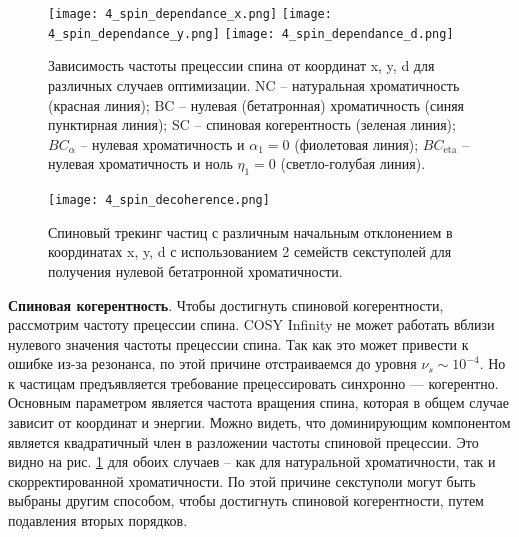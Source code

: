 \begin{figure}[!h]
	\centering
	\texttt{[image: 4\_spin\_dependance\_x.png]}
	\texttt{[image: 4\_spin\_dependance\_y.png]}
	\texttt{[image: 4\_spin\_dependance\_d.png]}
	\caption{Зависимость частоты прецессии спина от координат x, y, d для различных случаев оптимизации. NC – натуральная хроматичность (красная линия); BC – нулевая (бетатронная) хроматичность (синяя пунктирная линия); SC – спиновая когерентность (зеленая линия); $BC_{\alpha}$ – нулевая хроматичность и $\alpha_1=0$ (фиолетовая линия); $BC_{\text{eta}}$ – нулевая хроматичность и ноль $\eta_1=0$ (светло-голубая линия).}
	\label{fig:4_spin_dependance}
\end{figure}

\begin{figure}[!h]
  \centering
   \texttt{[image: 4\_spin\_decoherence.png]}
   \caption{Спиновый трекинг частиц с различным начальным отклонением в координатах x, y, d с использованием 2 семейств секступолей для получения нулевой бетатронной хроматичности.}
   \label{fig:4_spin_decoherence}
\end{figure}

\textbf{Спиновая когерентность}. Чтобы достигнуть спиновой когерентности, рассмотрим частоту прецессии спина. COSY Infinity \cite{cosy} не может работать вблизи нулевого значения частоты прецессии спина. Так как это может привести к ошибке из-за резонанса, по этой причине отстраиваемся до уровня $\nu_s\sim{10}^{-4}$. Но к частицам предъявляется требование прецессировать синхронно — когерентно. Основным параметром является частота вращения спина, которая в общем случае зависит от координат и энергии. Можно видеть, что доминирующим компонентом является квадратичный член в разложении частоты спиновой прецессии. Это видно на рис. \ref{fig:4_spin_dependance} для обоих случаев – как для натуральной хроматичности, так и скорректированной хроматичности. По этой причине секступоли могут быть выбраны другим способом, чтобы достигнуть спиновой когерентности, путем подавления вторых порядков.

